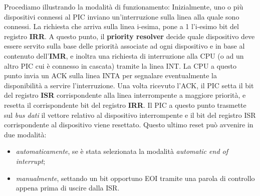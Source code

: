 Procediamo illustrando la modalità di funzionamento:
Inizialmente, uno o più dispositivi connessi al PIC inviano un'interruzione sulla linea alla quale sono connessi. La richiesta che arriva sulla linea i-esima, pone a 1 l'i-esimo bit del registro \textbf{IRR}. A questo punto, il \textbf{priority resolver} decide quale dispositivo deve essere servito sulla base delle priorità associate ad ogni dispositivo e in base al contenuto dell'\textbf{IMR}, e inoltra una richiesta di interruzione alla CPU (o ad un altro PIC cui è connesso in cascata) tramite la linea INT. La CPU a questo punto invia un ACK sulla linea INTA per segnalare eventualmente la disponibilità a servire l'interruzione. 
Una volta ricevuto l'ACK, il PIC setta il bit del registro \textbf{ISR} corrispondente alla linea interrompente a maggiore priorità, e resetta il corrispondente bit del registro \textbf{IRR}. Il PIC a questo punto trasmette sul \textit{bus dati} il vettore relativo al dispositivo interrompente e il bit del registro ISR corrispondente al dispositivo viene resettato. Questo ultimo reset può avvenire in due modalità:
\begin{itemize}
    \linespread{0.4}
    \item \textit{automaticamente}, se è stata selezionata la modalità \textit{automatic end of interrupt};
    \item \textit{manualmente}, settando un bit opportuno EOI tramite una parola di controllo appena prima di uscire dalla ISR.
\end{itemize}

